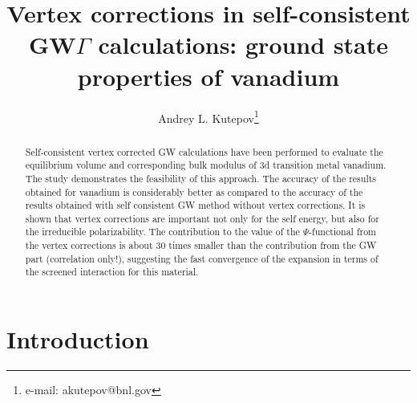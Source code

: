 \documentclass[aps,prb,floatfix,epsfig,twocolumn,preprintnumbers]{revtex4}
\begin{document}
\title{Vertex corrections in self-consistent GW$\Gamma$ calculations: ground state properties of vanadium}
\author{Andrey L. Kutepov\footnote{e-mail: akutepov@bnl.gov}}

\begin{abstract}
Self-consistent vertex corrected GW calculations have been performed to evaluate the equilibrium volume and corresponding bulk modulus of 3d transition metal vanadium. The study demonstrates the feasibility of this approach. The accuracy of the results obtained for vanadium is considerably better as compared to the accuracy of the results obtained with self consistent GW method without vertex corrections. It is shown that vertex corrections are important not only for the self energy, but also for the irreducible polarizability. The contribution to the value of the $\Psi$-functional from the vertex corrections is about 30 times smaller than the contribution from the GW part (correlation only!), suggesting the fast convergence of the expansion in terms of the screened interaction for this material.
\end{abstract}

\maketitle


\section*{Introduction}
\label{intro}
\end{document}
